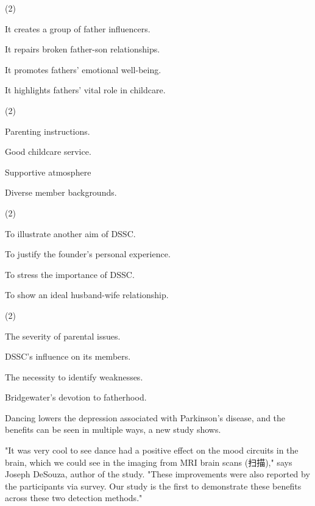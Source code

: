 \documentclass{英语试卷}
\begin{document}
\begin{choices}(2)
  \item It creates a group of father influencers.
  \item It repairs broken father-son relationships.
  \item It promotes fathers' emotional well-being.
  \item It highlights fathers' vital role in childcare.
\end{choices}
\begin{choices}(2)
  \item Parenting instructions.
  \item Good childcare service.
  \item Supportive atmosphere
  \item Diverse member backgrounds.
\end{choices}
\begin{choices}(2)
  \item To illustrate another aim of DSSC.
  \item To justify the founder's personal experience.
  \item To stress the importance of DSSC.
  \item To show an ideal husband-wife relationship.
\end{choices}
\begin{choices}(2)
  \item The severity of parental issues.
  \item DSSC's influence on its members.
  \item The necessity to identify weaknesses.
  \item Bridgewater's devotion to fatherhood.
\end{choices}
\par Dancing lowers the depression associated with Parkinson's disease, and the benefits can be seen in multiple ways, a new study shows.\par
\par "It was very cool to see dance had a positive effect on the mood circuits in the brain, which we could see in the imaging from MRI brain scans (扫描)," says Joseph DeSouza, author of the study. "These improvements were also reported by the participants via survey. Our study is the first to demonstrate these benefits across these two detection methods."\par
\end{document}
